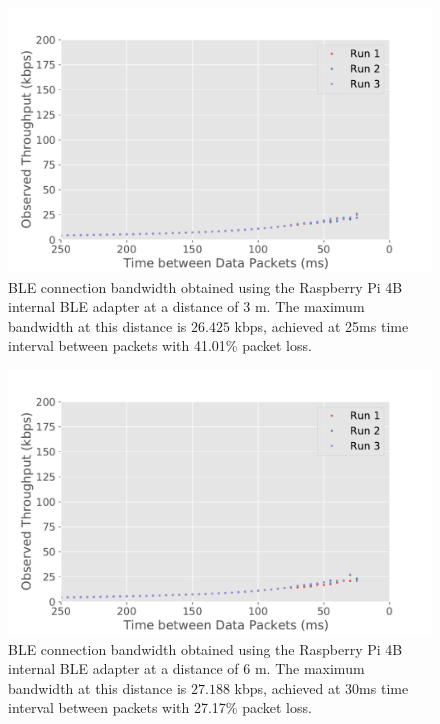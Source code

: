 \begin{figure}[H]
    \centering
    \includegraphics[width=0.75\linewidth]{images/ble-bandwidth-hci1-300cm.pdf}
    \caption[\acs{BLE} connection bandwidth obtained using the ASUS USB-BT500 adapter at a distance of 3 m.]    {\acs{BLE} connection bandwidth obtained using the Raspberry Pi 4B internal \acs{BLE} adapter at a distance of 3 m. The maximum bandwidth at this distance is $26.425$ kbps, achieved at 25ms time interval between packets with 41.01\% packet loss.}
    \label{fig:ble-bandwidth-hci1-3m}
\end{figure}

\begin{figure}[H]
    \centering
    \includegraphics[width=0.75\linewidth]{images/ble-bandwidth-hci1-600cm.pdf}
    \caption[\acs{BLE} connection bandwidth obtained using the ASUS USB-BT500 adapter at a distance of 6 m.]{\acs{BLE} connection bandwidth obtained using the Raspberry Pi 4B internal \acs{BLE} adapter at a distance of $6\text{ m}$. The maximum bandwidth at this distance is $27.188$ kbps, achieved at 30ms time interval between packets with 27.17\% packet loss.}
    \label{fig:ble-bandwidth-hci1-6m}
\end{figure}

